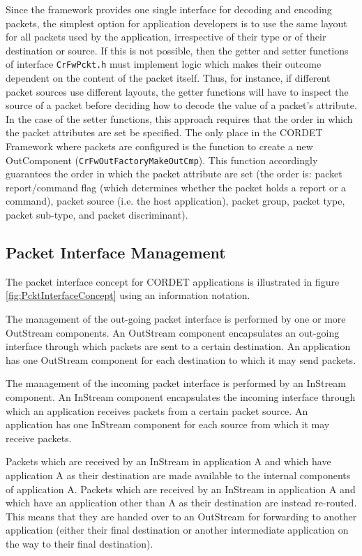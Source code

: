 \documentclass{pnp_article}
\begin{document}
Since the framework provides one single interface for decoding and encoding packets, the simplest option for application developers is to use the same layout for all packets used by the application, irrespective of their type or of their destination or source. If this is not possible, then the getter and setter functions of interface \texttt{CrFwPckt.h} must implement logic which makes their outcome dependent on the content of the packet itself. Thus, for instance, if different packet sources use different layouts, the getter functions will have to inspect the source of a packet before deciding how to decode the value of a packet's attribute. In the case of the setter functions, this approach requires that the order in which the packet attributes are set be specified. The only place in the CORDET Framework where packets are configured is the function to create a new OutComponent (\texttt{CrFwOutFactoryMakeOutCmp}). This function accordingly guarantees the order in which the packet attribute are set (the order is: packet report/command flag (which determines whether the packet holds a report or a command), packet source (i.e. the host application), packet group, packet type, packet sub-type, and packet discriminant).

\subsection{Packet Interface Management}

The packet interface concept for CORDET applications is illustrated in figure \ref{fig:PcktInterfaceConcept} using an information notation.

The management of the out-going packet interface is performed by one or more OutStream components. An OutStream component encapsulates an out-going interface through which packets are sent to a certain destination. An application has one OutStream component for each destination to which it may send packets.

The management of the incoming packet interface is performed by an InStream component. An InStream component encapsulates the incoming interface through which an application receives packets from a certain packet source. An application has one InStream component for each source from which it may receive packets.

Packets which are received by an InStream in application A and which have application A as their destination are made available to the internal components of application A. Packets which are received by an InStream in application A and which have an application other than A as their destination are instead re-routed. This means that they are handed over to an OutStream for forwarding to another application (either their final destination or another intermediate application on the way to their final destination).
\end{document}

